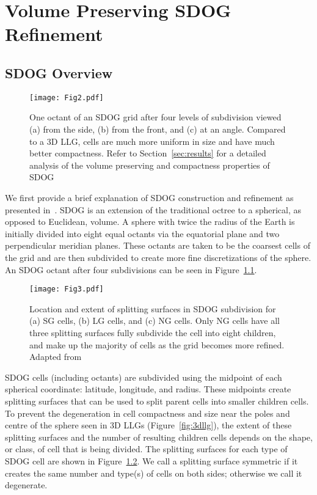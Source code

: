 \chapter{Volume Preserving SDOG Refinement} \label{chap:sdog}


\section{SDOG Overview}

\begin{figure}[tbp]
	\texttt{[image: Fig2.pdf]}
	\caption{One octant of an SDOG grid after four levels of subdivision viewed (a) from the side, (b) from the front, and (c) at an angle.
		Compared to a 3D LLG, cells are much more uniform in size and have much better compactness.
		Refer to Section~\ref{sec:results} for a detailed analysis of the volume preserving and compactness properties of SDOG}
	\label{fig:sdog}
\end{figure}


We first provide a brief explanation of SDOG construction and refinement as presented in~\cite{yu2009sdog}.
SDOG is an extension of the traditional octree to a spherical, as opposed to Euclidean, volume.
A sphere with twice the radius of the Earth is initially divided into eight equal octants via the equatorial plane and two perpendicular meridian planes.
These octants are taken to be the coarsest cells of the grid and are then subdivided to create more fine discretizations of the sphere.
An SDOG octant after four subdivisions can be seen in Figure~\ref{fig:sdog}.


\begin{figure}[tbp]
	\texttt{[image: Fig3.pdf]}
	\caption{Location and extent of splitting surfaces in SDOG subdivision for (a) SG cells, (b) LG cells, and (c) NG cells.
		Only NG cells have all three splitting surfaces fully subdivide the cell into eight children, and make up the majority of cells as the grid becomes more refined.
		Adapted from~\cite{yu2009sdog}}
	\label{fig:subRules}
\end{figure}


SDOG cells (including octants) are subdivided using the midpoint of each spherical coordinate: latitude, longitude, and radius.
These midpoints create splitting surfaces that can be used to split parent cells into smaller children cells.
To prevent the degeneration in cell compactness and size near the poles and centre of the sphere seen in 3D LLGs (Figure~\ref{fig:3dllg}), the extent of these splitting surfaces and the number of resulting children cells depends on the shape, or class, of cell that is being divided.
The splitting surfaces for each type of SDOG cell are shown in Figure~\ref{fig:subRules}.
We call a splitting surface symmetric if it creates the same number and type(s) of cells on both sides; otherwise we call it degenerate.


